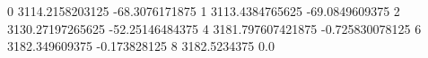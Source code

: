 0 3114.2158203125 -68.3076171875
1 3113.4384765625 -69.0849609375
2 3130.27197265625 -52.25146484375
4 3181.797607421875 -0.725830078125
6 3182.349609375 -0.173828125
8 3182.5234375 0.0
